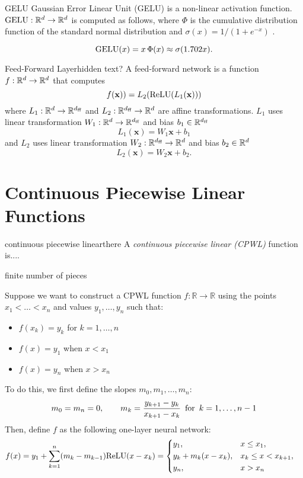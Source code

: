 \begin{definition}{GELU}{}
    Gaussian Error Linear Unit (GELU) is a non-linear activation function. $\text{GELU} : \mathbb{R}^d\to \mathbb{R}^d$ is computed as follows, where $\Phi$ is the cumulative distribution function of the standard normal distribution and $\sigma(x) = 1/(1+e^{-x})$ \cite{hendrycks2023}.

    \[\text{GELU}(x) = x\,\Phi(x) \approx \sigma(1.702 x).\]
\end{definition}

\begin{definition}{Feed-Forward Layer}{hidden text?}
    A feed-forward network is a function $f:\mathbb{R}^d\to \mathbb{R}^d$ that computes 
    \[f(\mathbf{x})) = L_2(\text{ReLU}(L_1(\mathbf{x})))\]
    where $L_1: \mathbb{R}^d \to \mathbb{R}^{d_{\text{ff}}}$ and $L_2: \mathbb{R}^{d_{\text{ff}}} \to \mathbb{R}^{d}$ are affine transformations. $L_1$ uses linear transformation $W_1:\mathbb{R}^d\to \mathbb{R}^{d_{\text{ff}}}$ and bias $b_1\in\mathbb{R}^{d_{\text{ff}}}$
    \[L_1(\mathbf{x}) = W_1 \mathbf{x} + b_1\]
    and $L_2$ uses linear transformation $W_2:\mathbb{R}^{d_{\text{ff}}}\to \mathbb{R}^d$ and bias $b_2\in\mathbb{R}^{d}$
    \[L_2(\mathbf{x}) = W_2 \mathbf{x} + b_2.\]
\end{definition}

\section{Continuous Piecewise Linear Functions}

\begin{definition}{continuous piecewise linear}{there}
A \emph{continuous piecewise linear (CPWL)} function is....

finite number of pieces
\end{definition}

Suppose we want to construct a CPWL function \(f \colon \mathbb{R} \to \mathbb{R}\) using the points \(x_1 < \ldots < x_n\) and values \(y_1, \ldots, y_n\) such that:
\begin{itemize}
    \item \(f(x_k) = y_k\) for \(k = 1, \ldots, n\)
    \item \(f(x) = y_1\) when \(x < x_1\)
    \item \(f(x) = y_n\) when \(x > x_n\)
\end{itemize}
To do this, we first define the slopes \(m_0, m_1, \ldots, m_n\):
\begin{align*}
    m_0 = m_{n} = 0,
    \qquad
    m_k = \frac{y_{k+1} - y_{k}}{x_{k+1} - x_{k}}
    \enskip \text{for} \enskip k = 1, \ldots, n-1
\end{align*}
Then, define \(f\) as the following one-layer neural network:
\begin{align*}
    f(x) &= y_1 + \sum_{k = 1}^{n} (m_{k} - m_{k-1}) \mathrm{ReLU}(x - x_k)
    = \begin{dcases}
        y_1, &x \leq x_1, \\
        y_k + m_{k} (x - x_k), & x_k \leq x < x_{k+1}, \\
        y_n, & x > x_n
    \end{dcases}
\end{align*}

